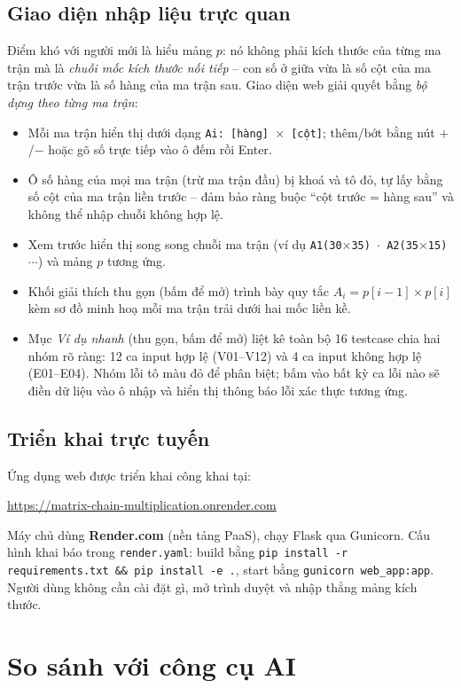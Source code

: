 \documentclass[12pt,a4paper]{article}
\begin{document}
\subsection{Giao diện nhập liệu trực quan}
Điểm khó với người mới là hiểu mảng $p$: nó không phải kích thước của từng ma trận mà là \emph{chuỗi mốc kích thước nối tiếp} -- con số ở giữa vừa là số cột của ma trận trước vừa là số hàng của ma trận sau. Giao diện web giải quyết bằng \emph{bộ dựng theo từng ma trận}:
\begin{itemize}
  \item Mỗi ma trận hiển thị dưới dạng \texttt{Ai: [hàng] $\times$ [cột]}; thêm/bớt bằng nút $+$/$-$ hoặc gõ số trực tiếp vào ô đếm rồi Enter.
  \item Ô số hàng của mọi ma trận (trừ ma trận đầu) bị khoá và tô đỏ, tự lấy bằng số cột của ma trận liền trước -- đảm bảo ràng buộc ``cột trước = hàng sau'' và không thể nhập chuỗi không hợp lệ.
  \item Xem trước hiển thị song song chuỗi ma trận (ví dụ \texttt{A1(30$\times$35) $\cdot$ A2(35$\times$15) $\cdots$}) và mảng $p$ tương ứng.
  \item Khối giải thích thu gọn (bấm để mở) trình bày quy tắc $A_i = p[i{-}1] \times p[i]$ kèm sơ đồ minh hoạ mỗi ma trận trải dưới hai mốc liền kề.
  \item Mục \emph{Ví dụ nhanh} (thu gọn, bấm để mở) liệt kê toàn bộ 16 testcase chia hai nhóm rõ ràng: 12 ca input hợp lệ (V01--V12) và 4 ca input không hợp lệ (E01--E04). Nhóm lỗi tô màu đỏ để phân biệt; bấm vào bất kỳ ca lỗi nào sẽ điền dữ liệu vào ô nhập và hiển thị thông báo lỗi xác thực tương ứng.
\end{itemize}

\subsection{Triển khai trực tuyến}
Ứng dụng web được triển khai công khai tại:
\begin{center}
\url{https://matrix-chain-multiplication.onrender.com}
\end{center}
Máy chủ dùng \textbf{Render.com} (nền tảng PaaS), chạy Flask qua Gunicorn. Cấu hình khai báo trong \texttt{render.yaml}: build bằng \texttt{pip install -r requirements.txt \&\& pip install -e .}, start bằng \texttt{gunicorn web\_app:app}. Người dùng không cần cài đặt gì, mở trình duyệt và nhập thẳng mảng kích thước.

\section{So sánh với công cụ AI}
\end{document}
